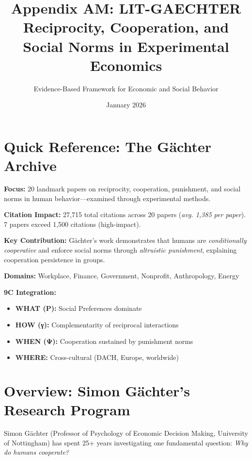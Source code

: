 \documentclass[11pt]{article}
\title{Appendix AM: LIT-GAECHTER \\
Reciprocity, Cooperation, and Social Norms in Experimental Economics}
\author{Evidence-Based Framework for Economic and Social Behavior}
\date{January 2026}
\begin{document}
\maketitle

\section*{Quick Reference: The Gächter Archive}

\textbf{Focus:} 20 landmark papers on reciprocity, cooperation, punishment, and
social norms in human behavior—examined through experimental methods.

\textbf{Citation Impact:} 27,715 total citations across 20 papers
(\textit{avg. 1,385 per paper}). 7 papers exceed 1,500 citations (high-impact).

\textbf{Key Contribution:} Gächter's work demonstrates that humans are
\textit{conditionally cooperative} and enforce social norms through
\textit{altruistic punishment}, explaining cooperation persistence in groups.

\textbf{Domains:} Workplace, Finance, Government, Nonprofit, Anthropology, Energy

\textbf{9C Integration:}
\begin{itemize}
    \item \textbf{WHAT (P):} Social Preferences dominate
    \item \textbf{HOW (γ):} Complementarity of reciprocal interactions
    \item \textbf{WHEN (Ψ):} Cooperation sustained by punishment norms
    \item \textbf{WHERE:} Cross-cultural (DACH, Europe, worldwide)
\end{itemize}

\section*{Overview: Simon Gächter's Research Program}

Simon Gächter (Professor of Psychology of Economic Decision Making, University of
Nottingham) has spent 25+ years investigating one fundamental question:
\textit{Why do humans cooperate?}
\end{document}

